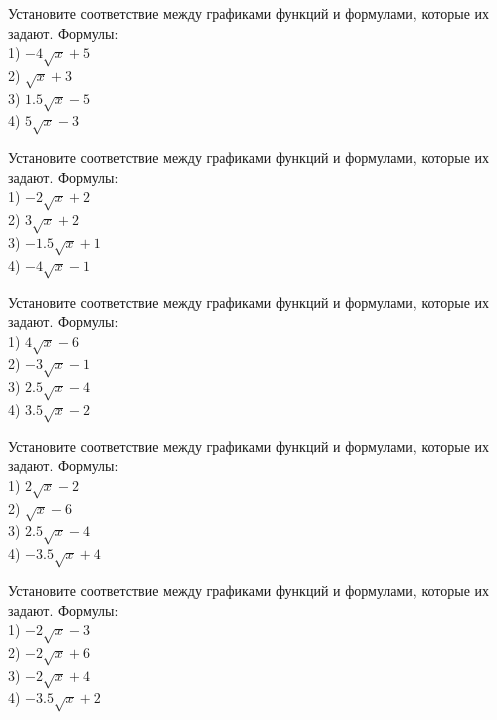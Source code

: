\documentclass[4apaper]{article}
\begin{document}
\begin{taskBN}{81}
Установите соответствие между графиками функций и формулами, которые их задают. Формулы: \\1) $-4\sqrt{x}+5$\\2) $\sqrt{x}+3$\\3) $1.5\sqrt{x}-5$\\4) $5\sqrt{x}-3$
\end{taskBN}

\begin{taskBN}{82}
Установите соответствие между графиками функций и формулами, которые их задают. Формулы: \\1) $-2\sqrt{x}+2$\\2) $3\sqrt{x}+2$\\3) $-1.5\sqrt{x}+1$\\4) $-4\sqrt{x}-1$
\end{taskBN}

\begin{taskBN}{83}
Установите соответствие между графиками функций и формулами, которые их задают. Формулы: \\1) $4\sqrt{x}-6$\\2) $-3\sqrt{x}-1$\\3) $2.5\sqrt{x}-4$\\4) $3.5\sqrt{x}-2$
\end{taskBN}

\begin{taskBN}{84}
Установите соответствие между графиками функций и формулами, которые их задают. Формулы: \\1) $2\sqrt{x}-2$\\2) $\sqrt{x}-6$\\3) $2.5\sqrt{x}-4$\\4) $-3.5\sqrt{x}+4$
\end{taskBN}

\begin{taskBN}{85}
Установите соответствие между графиками функций и формулами, которые их задают. Формулы: \\1) $-2\sqrt{x}-3$\\2) $-2\sqrt{x}+6$\\3) $-2\sqrt{x}+4$\\4) $-3.5\sqrt{x}+2$
\end{taskBN}
\end{document}
